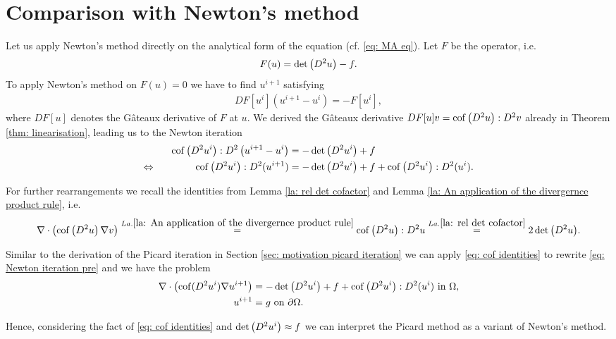 \section{Comparison with Newton's method}

Let us apply Newton's method directly on the analytical form of the \MA equation (cf. \eqref{eq: MA eq}).
Let $F$ be the \MA operator, i.e. 
\[
	F(u) = \det{\left(D^2 u\right)} -f.
\]
To apply Newton's method on $F(u) =0$ we have to find $u^{i+1}$ satisfying
\begin{align}
	DF[u^i](u^{i+1}-u^i) = -F[u^i],
\end{align}
where $DF[u]$ denotes the G\^ateaux derivative of $F$ at $u$. We derived the G\^ateaux derivative $DF[u] v = \operatorname{cof} \left( D^2 u \right):D^2v$ already in Theorem \ref{thm: linearisation}, leading us to the Newton iteration
\begin{align}
	\operatorname{cof} \left( D^2 u^i \right):D^2\left(u^{i+1}-u^i\right) &= -\det{\left(D^2 u^i\right)}+f \nonumber \\
	\Leftrightarrow \qquad \qquad  \operatorname{cof} \left( D^2 u^i \right):D^2(u^{i+1}) &= -\det{\left(D^2 u^i\right)} +f  +\operatorname{cof} \left( D^2 u^i \right):D^2(u^i). \label{eq: Newton iteration pre}
\end{align}

For further rearrangements we recall the identities from Lemma \ref{la: rel det cofactor} and Lemma \ref{la: An application of the divergernce product rule}, i.e. 
\begin{align}
	\nabla \cdot \left( \operatorname{cof} \left( D^2 u  \right) \nabla v \right)
	\stackrel{La.\ref{la: An application of the divergernce product rule}}=\operatorname{cof} \left( D^2 u \right):D^2u
	\stackrel{La.\ref{la: rel det cofactor}}=2 \det{\left(D^2u\right)}. \label{eq: cof identities}
\end{align}

Similar to the derivation of the Picard iteration in Section \ref{sec: motivation picard iteration} we can apply \eqref{eq: cof identities} to rewrite \eqref{eq: Newton iteration pre} and we have the problem
\begin{align}
	\nabla \cdot \left( \operatorname{cof}(D^2 u^i) \nabla u^{i+1} \right) &= -\det{\left(D^2u^i\right)} +f+\operatorname{cof} \left( D^2 u^i \right):D^2(u^i)  \textnormal{ in } \Omega,  \label{eq: Newton iteration}\\
	u^{i+1} &= g \textnormal{ on } \partial \Omega .
\end{align}

Hence, considering the fact of \eqref{eq: cof identities} and $\det{\left(D^2 u^i\right)} \approx f$ we can interpret the Picard method as a variant of Newton's method. 

